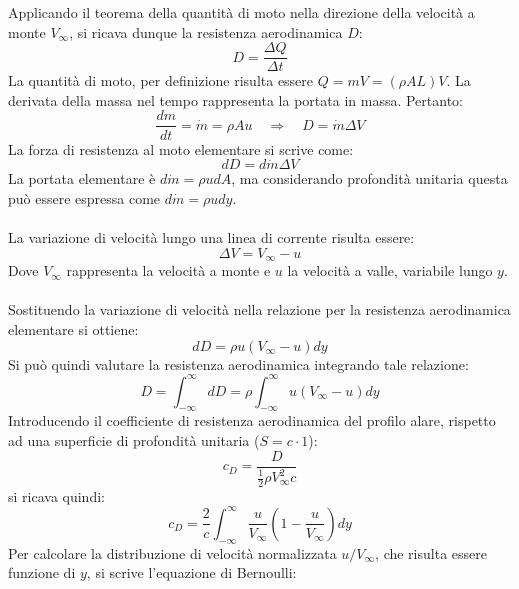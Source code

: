 \noindent Applicando il teorema della quantità di moto nella direzione della velocità a monte $V_\infty$, si ricava dunque la resistenza aerodinamica $D$:
\begin{equation*}
    D = \frac{\Delta Q}{\Delta t}
\end{equation*}
La quantità di moto, per definizione risulta essere $Q=mV=(\rho AL )V$. La derivata della massa nel tempo rappresenta la portata in massa. Pertanto:
\begin{equation*}
    \frac{dm}{dt} = \dot m = \rho A u \quad \Rightarrow \quad D= \dot m \Delta V
\end{equation*}
La forza di resistenza al moto elementare si scrive come:
\begin{equation*}
    dD = d\dot m \Delta V
\end{equation*}
La portata elementare è $d\dot m = \rho u dA$, ma considerando profondità unitaria questa può essere espressa come $d\dot m = \rho u dy$.\\\\
La variazione di velocità lungo una linea di corrente risulta essere:
\begin{equation*}
    \Delta V = V_\infty - u
\end{equation*}
Dove $V_\infty$ rappresenta la velocità a monte e $u$ la velocità a valle, variabile lungo $y$.\\\\
Sostituendo la variazione di velocità nella relazione per la resistenza aerodinamica elementare si ottiene:
\begin{equation*}
    dD = \rho u (V_\infty -u ) dy
\end{equation*}
Si può quindi valutare la resistenza aerodinamica integrando tale relazione:
\begin{equation*}
    D = \int_{-\infty}^\infty dD = \rho \int_{-\infty}^\infty u (V_\infty - u) dy
\end{equation*}
Introducendo il coefficiente di resistenza aerodinamica del profilo alare, rispetto ad una superficie di profondità unitaria ($S = c\cdot1$):
\begin{equation*}
    c_D = \frac{D}{\frac12 \rho V_\infty^2 c}
\end{equation*}
si ricava quindi:
\begin{equation*}
    c_D = \frac 2c \int_{-\infty}^\infty \frac {u}{V_\infty} \left( 1-\frac{u}{V_\infty}\right) dy
\end{equation*}
Per calcolare la distribuzione di velocità normalizzata $u/V_\infty$, che risulta essere funzione di $y$, si scrive l'equazione di Bernoulli:
